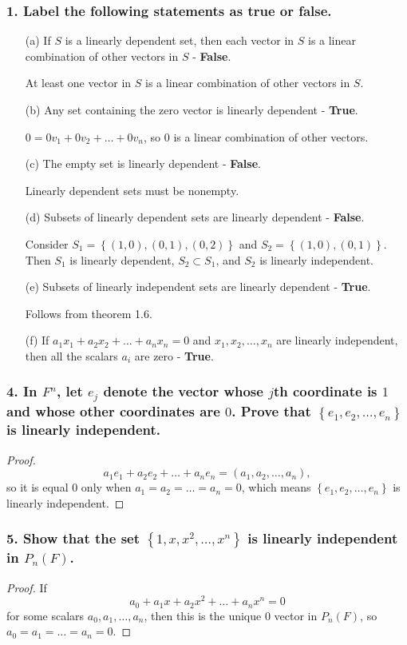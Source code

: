 \documentclass{article}
\begin{document}
\subsubsection*{1. Label the following statements as true or false.}
\begin{enumerate}
	\item[(a)] If $S$ is a linearly dependent set, then each vector in $S$ is a linear combination of other vectors in $S$ - \textbf{False}.
	
	At least one vector in $S$ is a linear combination of other vectors in $S$.
	\item[(b)] Any set containing the zero vector is linearly dependent - \textbf{True}.
	
	$0 = 0v_1 + 0v_2 + \dots + 0v_n$, so $0$ is a linear combination of other vectors.
	\item[(c)] The empty set is linearly dependent - \textbf{False}.
	
	Linearly dependent sets must be nonempty.
	\item[(d)] Subsets of linearly dependent sets are linearly dependent - \textbf{False}.
	
	Consider $S_1 = \left\{(1, 0), (0, 1), (0, 2)\right\}$ and $S_2 = \left\{(1, 0), (0, 1)\right\}$. Then $S_1$ is linearly dependent, $S_2 \subset S_1$, and $S_2$ is linearly independent.
	\item[(e)] Subsets of linearly independent sets are linearly dependent - \textbf{True}.
	
	Follows from theorem 1.6.
	\item[(f)] If $a_1x_1 + a_2x_2 + \dots + a_nx_n = 0$ and $x_1, x_2, \dots, x_n$ are linearly independent, then all the scalars $a_i$ are zero - \textbf{True}.
\end{enumerate}

\subsubsection*{4. In $F^n$, let $e_j$ denote the vector whose $j$th coordinate is $1$ and whose other coordinates are $0$. Prove that $\left\{e_1, e_2, \dots, e_n\right\}$ is linearly independent.}
\begin{proof}
	\[a_1e_1 + a_2e_2 + \dots + a_ne_n = \left(a_1, a_2, \dots, a_n\right),\] so it is equal $0$ only when $a_1 = a_2 = \dots = a_n = 0$, which means $\left\{e_1, e_2, \dots, e_n\right\}$ is linearly independent.
\end{proof}

\subsubsection*{5. Show that the set $\left\{1, x, x^2, \dots, x^n\right\}$ is linearly independent in $P_n(F)$.}
\begin{proof}
	If \[a_0 + a_1x + a_2x^2 + \dots + a_nx^n = 0\]for some scalars $a_0, a_1, \dots, a_n$, then this is the unique $0$ vector in $P_n(F)$, so $a_0 = a_1 = \dots = a_n = 0$.
\end{proof}
\end{document}
